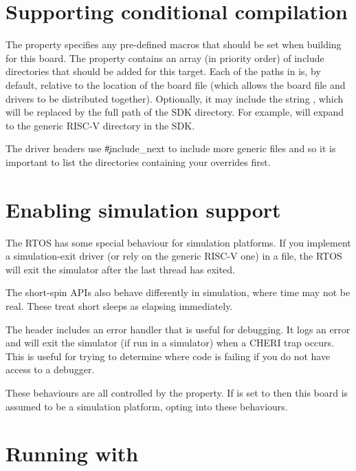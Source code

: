 \section{Supporting conditional compilation}

The  property specifies any pre-defined macros that should be set when building for this board.
The  property contains an array (in priority order) of include directories that should be added for this target.
Each of the paths in  is, by default, relative to the location of the board file (which allows the board file and drivers to be distributed together).
Optionally, it may include the string , which will be replaced by the full path of the SDK directory.
For example,  will expand to the generic RISC-V directory in the SDK.

The driver headers use \c{#include_next} to include more generic files and so it is important to list the directories containing your overrides first.

\section{Enabling simulation support}

The RTOS has some special behaviour for simulation platforms.
If you implement a simulation-exit driver (or rely on the generic RISC-V one) in a  file, the RTOS will exit the simulator after the last thread has exited.

The short-spin APIs also behave differently in simulation, where time may not be real.
These treat short sleeps as elapsing immediately.

The  header includes an error handler that is useful for debugging.
It logs an error and will exit the simulator (if run in a simulator) when a CHERI trap occurs.
This is useful for trying to determine where code is failing if you do not have access to a debugger.

These behaviours are all controlled by the  property.
If  is set to  then this board is assumed to be a simulation platform, opting into these behaviours.

\section{Running with }

